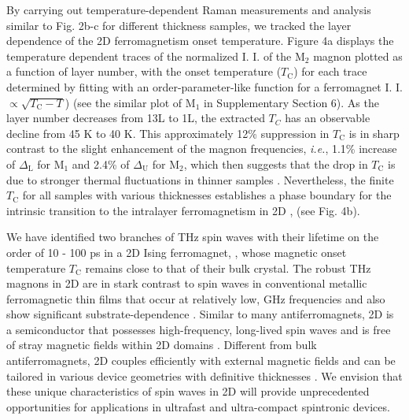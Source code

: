 \documentclass[prl, preprint, superscriptaddress]{revtex4-1}
\begin{document}
By carrying out temperature-dependent Raman measurements and analysis similar to Fig. 2b-c for different thickness samples, we tracked the layer dependence of the 2D ferromagnetism onset temperature. Figure 4a displays the temperature dependent traces of the normalized I. I. of the $\mathrm{M_2}$ magnon plotted as a function of layer number, with the onset temperature ($T_\mathrm{C}$) for each trace determined by fitting with an order-parameter-like function for a ferromagnet I. I. $\propto\sqrt{T_\mathrm{C}-T}$) (see the similar plot of $\mathrm{M_1}$ in Supplementary Section 6). As the layer number decreases from 13L to 1L, the extracted $T_C$ has an observable decline from 45 K to 40 K. This approximately 12\% suppression in $T_\mathrm{C}$ is in sharp contrast to the slight enhancement of the magnon frequencies, \textit{i.e.}, 1.1\% increase of $\Delta_\mathrm{L}$ for $\mathrm{M_1}$ and 2.4\% of $\Delta_\mathrm{U}$ for $\mathrm{M_2}$, which then suggests that the drop in $T_\mathrm{C}$ is due to stronger thermal fluctuations in thinner samples \cite{Mermin1966}. Nevertheless, the finite $T_\mathrm{C}$ for all samples with various thicknesses establishes a phase boundary for the intrinsic transition to the intralayer ferromagnetism in 2D , (see Fig. 4b). 

We have identified two branches of THz spin waves with their lifetime on the order of 10 - 100 ps in a 2D Ising ferromagnet, , whose magnetic onset temperature $T_\mathrm{C}$ remains close to that of their bulk crystal. The robust THz magnons in 2D  are in stark contrast to spin waves in conventional metallic ferromagnetic thin films that occur at relatively low, GHz frequencies \cite{Walowski2016} and also show significant substrate-dependence \cite{Huang1994, Back1995, Elmers1996}. Similar to many antiferromagnets, 2D  is a semiconductor that possesses high-frequency, long-lived spin waves and is free of stray magnetic fields within 2D domains \cite{Van2000, Park2009}. Different from bulk antiferromagnets, 2D  couples efficiently with external magnetic fields \cite{Huang2017, Zhong2017, Seyler2018, Song2018, Klein2018, Kim2018} and can be tailored in various device geometries with definitive thicknesses \cite{Jiang2018Electric, Jiang2018Controlling}. We envision that these unique characteristics of spin waves in 2D  will provide unprecedented opportunities for applications in ultrafast and ultra-compact spintronic devices.\\
\end{document}
